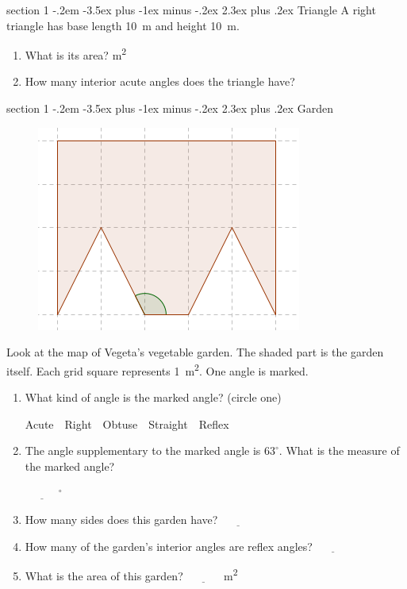\documentclass[12pt,letterpaper]{article}
\makeatletter
\newenvironment{problem}{\@startsection
       {section}
       {1}
       {-.2em}
       {-3.5ex plus -1ex minus -.2ex}
       {2.3ex plus .2ex}
       {\pagebreak[3]
       \large\bf\noindent{Problem }
       }
       }
\makeatother
\begin{document}
\begin{problem}{Triangle}
 A right triangle has base length \SI{10}{\meter}
 and height \SI{10}{\meter}.
 
 \begin{enumerate}
  \item What is its area?
  \hfill \underline{\hspace{3em}} \si{\meter^2}
  \item How many interior acute angles does the triangle have?
  \hfill \underline{\hspace{3em}}
 \end{enumerate}
\end{problem}

\begin{problem}{Garden}
\begin{figure}[h]
  \begin{center}
    \includegraphics[width=.4\textwidth]{garden.png}
  \end{center}
\end{figure}

 Look at the map of Vegeta's vegetable garden. The shaded part is the
 garden itself. Each grid square represents \SI{1}{\meter^2}. One angle is marked.
 
 \begin{enumerate}
  \item What kind of angle is the marked angle? (circle one)
  
  \hfill Acute~~Right~~Obtuse~~Straight~~Reflex
  
  \item The angle supplementary to the marked angle is $63^\circ$.
  What is the measure of the marked angle?
  
  \hfill $\underline{\hspace{3em}}^\circ$

  \item How many sides does this garden have? \hfill $\underline{\hspace{3em}}$

  \item How many of the garden's interior angles are reflex angles?
  \hfill $\underline{\hspace{3em}}$
  
  \item What is the area of this garden? \hfill $\underline{\hspace{3em}}$ \si{\meter^2}
 \end{enumerate}

\end{problem}
\end{document}

